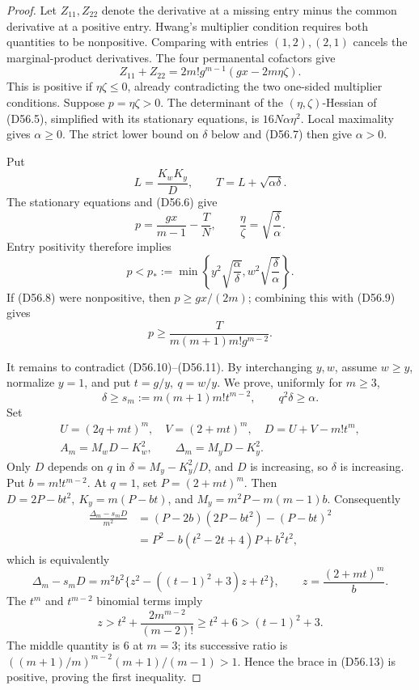 \documentclass[10pt,a4paper]{amsart}
\theoremstyle{definition}
\theoremstyle{remark}
\begin{document}
\begin{proof}
Let \(Z_{11},Z_{22}\) denote the derivative at a missing entry minus the
common derivative at a positive entry. Hwang's multiplier condition
\cite[Lemma 3.6]{CW} requires both quantities to be nonpositive. Comparing
with entries \((1,2),(2,1)\) cancels the marginal-product derivatives. The four
permanental cofactors give
\[
Z_{11}+Z_{22}
=2m!g^{m-1}(gx-2m\eta\zeta).                       \tag{D56.8}
\]
This is positive if \(\eta\zeta\leq0\), already contradicting the two
one-sided multiplier conditions. Suppose \(p=\eta\zeta>0\). The determinant
of the \((\eta,\zeta)\)-Hessian of (D56.5), simplified with its stationary
equations, is \(16N\alpha\eta^2\). Local maximality gives \(\alpha\geq0\).
The strict lower bound on \(\delta\) below and (D56.7) then give
\(\alpha>0\).

Put
\[
L=\frac{K_wK_y}{D},\qquad T=L+\sqrt{\alpha\delta}.
\]
The stationary equations and (D56.6) give
\[
p=\frac{gx}{m-1}-\frac{T}{N},\qquad
\frac{\eta}{\zeta}=\sqrt{\frac{\delta}{\alpha}}.   \tag{D56.9}
\]
Entry positivity therefore implies
\[
p<p_*:=\min\left\{
y^2\sqrt{\frac{\alpha}{\delta}},
w^2\sqrt{\frac{\delta}{\alpha}}\right\}.           \tag{D56.10}
\]
If (D56.8) were nonpositive, then \(p\geq gx/(2m)\);
combining this with (D56.9) gives
\[
p\geq\frac{T}{m(m+1)m!g^{m-2}}.                   \tag{D56.11}
\]

It remains to contradict (D56.10)--(D56.11). By interchanging \(y,w\),
assume \(w\geq y\), normalize \(y=1\), and put
\(t=g/y,\ q=w/y\). We prove, uniformly for \(m\geq3\),
\[
\delta\geq s_m:=m(m+1)m!t^{m-2},\qquad
q^2\delta\geq\alpha.                               \tag{D56.12}
\]
Set
\[
\begin{gathered}
U=(2q+mt)^m,\quad V=(2+mt)^m,\quad D=U+V-m!t^m,\\
A_m=M_wD-K_w^2,\qquad \Delta_m=M_yD-K_y^2.
\end{gathered}
\]
Only \(D\) depends on \(q\) in
\(\delta=M_y-K_y^2/D\), and \(D\) is increasing, so \(\delta\) is
increasing. Put \(b=m!t^{m-2}\). At \(q=1\), set \(P=(2+mt)^m\).
Then \(D=2P-bt^2,\ K_y=m(P-bt)\), and
\(M_y=m^2P-m(m-1)b\). Consequently
\[
\begin{split}
\frac{\Delta_m-s_mD}{m^2}
&=(P-2b)(2P-bt^2)-(P-bt)^2\\
&=P^2-b(t^2-2t+4)P+b^2t^2,
\end{split}
\]
which is equivalently
\[
\Delta_m-s_mD
=m^2b^2\{z^2-((t-1)^2+3)z+t^2\},\qquad
z=\frac{(2+mt)^m}{b}.                              \tag{D56.13}
\]
The \(t^m\) and \(t^{m-2}\) binomial terms imply
\[
z>t^2+\frac{2m^{m-2}}{(m-2)!}\geq t^2+6
>(t-1)^2+3.
\]
The middle quantity is \(6\) at \(m=3\); its successive ratio is
\(((m+1)/m)^{m-2}(m+1)/(m-1)>1\). Hence
the brace in (D56.13) is positive, proving the first inequality.


\end{proof}
\end{document}
